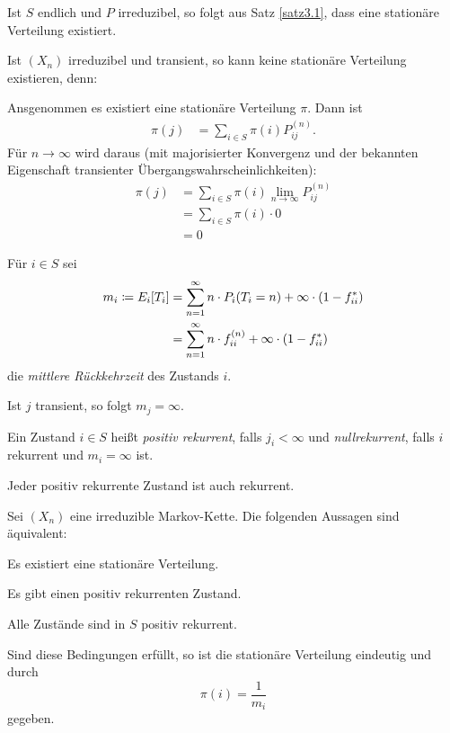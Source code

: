 \documentclass[a4paper,twoside,DIV15,BCOR12mm]{scrbook}
\begin{document}
\begin{bemerkung}
\begin{enuma}
\item Ist $S$ endlich und $P$ irreduzibel, so folgt aus Satz \ref{satz3.1}, dass eine stationäre Verteilung existiert.
\item Ist $(X_n)$ irreduzibel und transient, so kann  keine stationäre Verteilung existieren, denn:

Ansgenommen es existiert eine stationäre Verteilung $\pi$. Dann ist
\begin{align*}
\pi(j) &= \sum_{i\in S} \pi(i) P_{ij}^{(n)}.
\end{align*}
Für $n\to\infty$ wird daraus (mit majorisierter Konvergenz und der bekannten Eigenschaft transienter Übergangswahrscheinlichkeiten):
\begin{align*}
\pi(j) &= \sum_{i\in S} \pi(i) \lim_{n\to\infty} P_{ij}^{(n)} \\
&= \sum_{i\in S} \pi(i) \cdot 0 \\
&= 0
\end{align*}
\end{enuma}

\end{bemerkung}

\begin{definition}
Für $i\in S$ sei
\begin{align*}
m_i \da E_i[T_i] &= \sum_{n=1}^\infty n \cdot P_i(T_i=n) + \infty \cdot (1-f_{ii}^*) \\
&= \sum_{n=1}^\infty  n\cdot f_{ii}^{(n)} + \infty \cdot (1-f_{ii}^*)
\end{align*}
die \emph{mittlere Rückkehrzeit} des Zustands $i$.
\end{definition}

\begin{bemerkung}
Ist $j$ transient, so folgt $m_j=\infty$.
\end{bemerkung}

\begin{definition}
Ein Zustand $i\in S$ heißt \emph{positiv rekurrent}, falls $j_i<\infty$ und \emph{nullrekurrent}, falls $i$ rekurrent und $m_i=\infty$ ist.
\end{definition}

\begin{bemerkung}
Jeder positiv rekurrente Zustand ist auch rekurrent.
\end{bemerkung}

\begin{satz}
Sei $(X_n)$ eine irreduzible Markov-Kette. Die folgenden Aussagen sind äquivalent:
\begin{enumi}
\item Es existiert eine stationäre Verteilung.
\item Es gibt einen positiv rekurrenten Zustand.
\item Alle Zustände sind in $S$ positiv rekurrent.
\end{enumi}
Sind diese Bedingungen erfüllt, so ist die stationäre Verteilung eindeutig und durch \[\pi(i)=\frac 1 {m_i}\] gegeben.
\end{satz}
\end{document}
